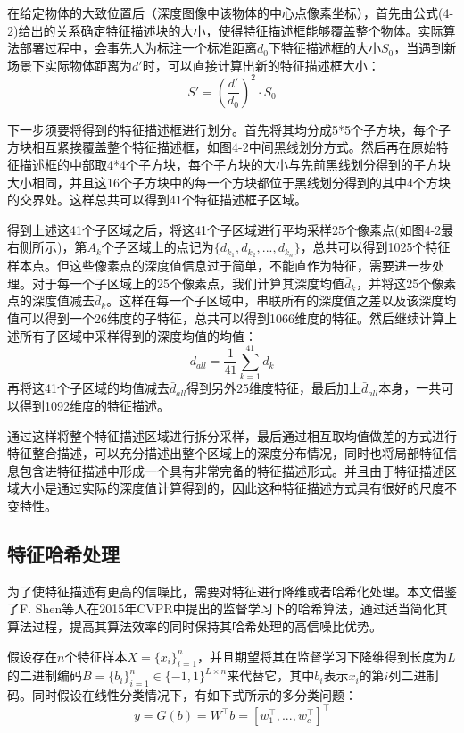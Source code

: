 在给定物体的大致位置后（深度图像中该物体的中心点像素坐标），首先由公式(4-2)给出的关系确定特征描述块的大小，使得特征描述框能够覆盖整个物体。实际算法部署过程中，会事先人为标注一个标准距离$d_0$下特征描述框的大小$S_0$，当遇到新场景下实际物体距离为$d'$时，可以直接计算出新的特征描述框大小：
\begin{equation}
	S'=\left(\frac{d'}{d_0}\right)^2\cdot S_0
\end{equation}

下一步须要将得到的特征描述框进行划分。首先将其均分成5*5个子方块，每个子方块相互紧挨覆盖整个特征描述框，如图4-2中间黑线划分方式。然后再在原始特征描述框的中部取4*4个子方块，每个子方块的大小与先前黑线划分得到的子方块大小相同，并且这16个子方块中的每一个方块都位于黑线划分得到的其中4个方块的交界处。这样总共可以得到41个特征描述框子区域。

得到上述这41个子区域之后，将这41个子区域进行平均采样25个像素点(如图4-2最右侧所示)，第$A_k$个子区域上的点记为$\{d_{k_1},d_{k_2},...,d_{k_n}\}$，总共可以得到1025个特征样本点。但这些像素点的深度值信息过于简单，不能直作为特征，需要进一步处理。对于每一个子区域上的25个像素点，我们计算其深度均值$\bar{d}_k$，并将这25个像素点的深度值减去$\bar{d}_k$。这样在每一个子区域中，串联所有的深度值之差以及该深度均值可以得到一个26纬度的子特征，总共可以得到1066维度的特征。然后继续计算上述所有子区域中采样得到的深度均值的均值：
\begin{equation}
	\bar{d}_{all}=\frac{1}{41}\sum_{k=1}^{41} \bar{d}_k
\end{equation}
再将这41个子区域的均值减去$\bar{d}_{all}$得到另外25维度特征，最后加上$\bar{d}_{all}$本身，一共可以得到1092维度的特征描述。

通过这样将整个特征描述区域进行拆分采样，最后通过相互取均值做差的方式进行特征整合描述，可以充分描述出整个区域上的深度分布情况，同时也将局部特征信息包含进特征描述中形成一个具有非常完备的特征描述形式。并且由于特征描述区域大小是通过实际的深度值计算得到的，因此这种特征描述方式具有很好的尺度不变特性。

\subsection{特征哈希处理} %

为了使特征描述有更高的信噪比，需要对特征进行降维或者哈希化处理。本文借鉴了F. Shen等人在2015年CVPR中提出的监督学习下的哈希算法\cite{shen2015supervised}，通过适当简化其算法过程，提高其算法效率的同时保持其哈希处理的高信噪比优势。

假设存在$n$个特征样本$X=\{x_i\}^{n}_{i=1}$，并且期望将其在监督学习下降维得到长度为$L$的二进制编码$B=\{b_i\}^{n}_{i=1}\in\{-1,1\}^{L\times n}$来代替它，其中$b_i$表示$x_i$的第$i$列二进制码。同时假设在线性分类情况下，有如下式所示的多分类问题：
\begin{equation}
	y=G(b)=W^{\top}b=\left[w_1^\top,...,w_c^\top\right]^\top
\end{equation}

